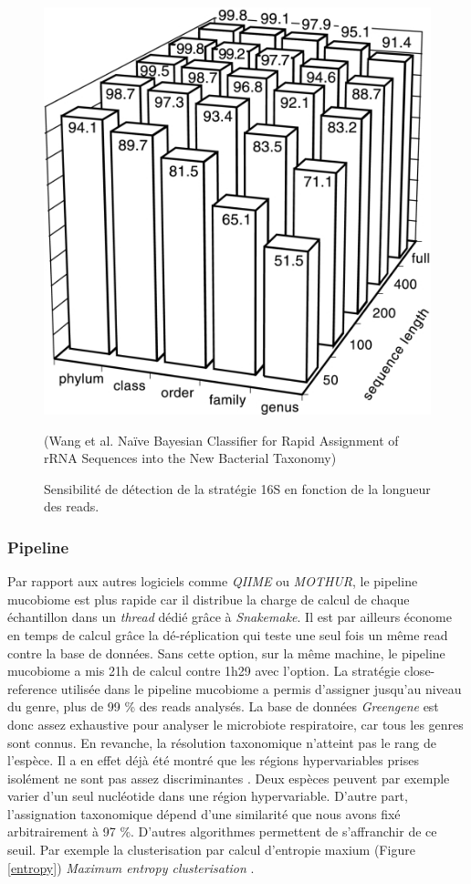 \documentclass[12pt,a4paper]{article}
\begin{document}
\begin{figure}
\begin{center}
\includegraphics[scale=3]{img/zam.jpg}\hfill
\end{center}
\caption{Sensibilité de détection de la stratégie 16S en fonction de la longueur des reads.} (Wang et al. Naïve Bayesian Classifier for Rapid Assignment of rRNA Sequences into the New Bacterial Taxonomy) 
\label{rnasens}
\end{figure}

\subsubsection{Pipeline}
Par rapport aux autres logiciels comme \textit{QIIME}\cite{Caporaso2010} ou \textit{MOTHUR}\cite{Schloss2009}, le pipeline mucobiome est  plus rapide car il distribue la charge de calcul de chaque échantillon dans un \textit{thread} dédié grâce à \textit{Snakemake}\cite{Koster2012}. Il est par ailleurs économe en temps de calcul grâce la dé-réplication qui teste une seul fois un même read contre la base de données. Sans cette option, sur la même machine, le pipeline mucobiome a mis 21h de calcul contre 1h29 avec l'option.
La stratégie close-reference utilisée dans le pipeline mucobiome a permis d'assigner jusqu'au niveau du genre, plus de 99 \% des reads analysés. La base de données \textit{Greengene} est donc assez exhaustive pour analyser le microbiote respiratoire, car tous les genres sont connus.
En revanche, la résolution taxonomique n'atteint pas le rang de l'espèce. Il a en effet déjà été montré que les régions hypervariables prises isolément ne sont pas assez discriminantes \cite{Yang2016}. Deux espèces peuvent par exemple varier d'un seul nucléotide dans une région hypervariable.
D'autre part, l'assignation taxonomique dépend d'une similarité que nous avons fixé arbitrairement à 97 \%. D'autres algorithmes permettent de s'affranchir de ce seuil. Par exemple la clusterisation par calcul d'entropie maxium (Figure \ref{entropy}) \textit{Maximum entropy clusterisation} \cite{Bobadilla2015}.
\end{document}
